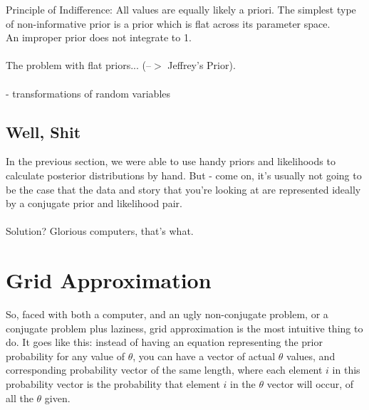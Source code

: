 \documentclass[12pt]{book}
\begin{document}
\begin{adjustwidth}{2em}{0pt}
{}
\end{adjustwidth}


Principle of Indifference: All values are equally likely a priori. The simplest type of non-informative prior is a prior which is flat across its parameter space.
\\
An improper prior does not integrate to 1. 
\\\\
The problem with flat priors... (--$>$ Jeffrey's Prior).
\\\\
- transformations of random variables



\section{Well, Shit}
In the previous section, we were able to use handy priors and likelihoods to calculate posterior distributions by hand. But - come on, it's usually not going to be the case that the data and story that you're looking at are represented ideally by a conjugate prior and likelihood pair. 
\\\\
Solution? Glorious computers, that's what.







\chapter{Grid Approximation}
So, faced with both a computer, and an ugly non-conjugate problem, or a conjugate problem plus laziness, grid approximation is the most intuitive thing to do. It goes like this: instead of having an equation representing the prior probability for any value of $\theta$, you can have a vector of actual $\theta$ values, and corresponding probability vector of the same length, where each element $i$ in this probability vector is the probability that element $i$ in the $\theta$ vector will occur, of all the $\theta$ given. 
\end{document}
